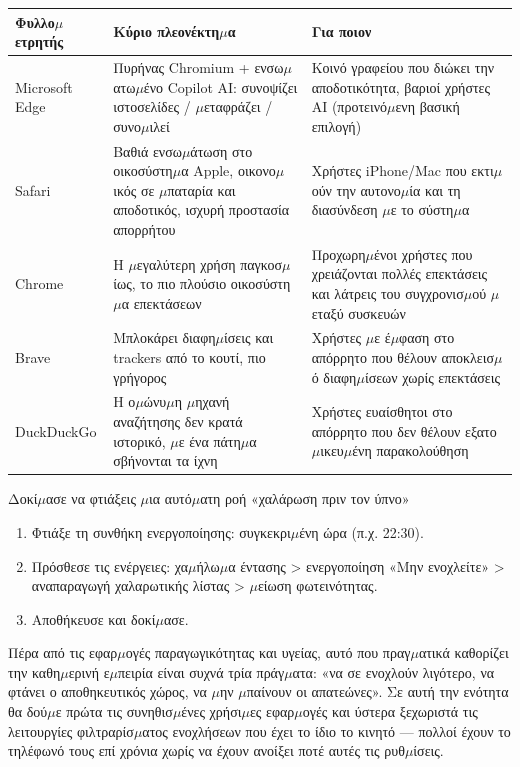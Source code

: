 \begin{center}
\begin{tabularx}{\linewidth}{|X|X|X|}
\hline
\textbf{Φυλλο$\mu$ετρητής} & \textbf{Κύριο πλεονέκτη$\mu$α} & \textbf{Για ποιον} \tabularnewline
\hline
Microsoft Edge & Πυρήνας Chromium + ενσω$\mu$ατω$\mu$ένο Copilot AI: συνοψίζει ιστοσελίδες / $\mu$εταφράζει / συνο$\mu$ιλεί & Κοινό γραφείου που διώκει την αποδοτικότητα, βαριοί χρήστες AI (προτεινό$\mu$ενη βασική επιλογή) \tabularnewline
Safari & Βαθιά ενσω$\mu$άτωση στο οικοσύστη$\mu$α Apple, οικονο$\mu$ικός σε $\mu$παταρία και αποδοτικός, ισχυρή προστασία απορρήτου & Χρήστες iPhone/Mac που εκτι$\mu$ούν την αυτονο$\mu$ία και τη διασύνδεση $\mu$ε το σύστη$\mu$α \tabularnewline
Chrome & Η $\mu$εγαλύτερη χρήση παγκοσ$\mu$ίως, το πιο πλούσιο οικοσύστη$\mu$α επεκτάσεων & Προχωρη$\mu$ένοι χρήστες που χρειάζονται πολλές επεκτάσεις και λάτρεις του συγχρονισ$\mu$ού $\mu$εταξύ συσκευών \tabularnewline
Brave & Μπλοκάρει διαφη$\mu$ίσεις και trackers από το κουτί, πιο γρήγορος & Χρήστες $\mu$ε έ$\mu$φαση στο απόρρητο που θέλουν αποκλεισ$\mu$ό διαφη$\mu$ίσεων χωρίς επεκτάσεις \tabularnewline
DuckDuckGo & Η ο$\mu$ώνυ$\mu$η $\mu$ηχανή αναζήτησης δεν κρατά ιστορικό, $\mu$ε ένα πάτη$\mu$α σβήνονται τα ίχνη & Χρήστες ευαίσθητοι στο απόρρητο που δεν θέλουν εξατο$\mu$ικευ$\mu$ένη παρακολούθηση \tabularnewline
\hline
\end{tabularx}
\end{center}

\begin{tcbpractice}{Δοκί$\mu$ασε να φτιάξεις $\mu$ια αυτό$\mu$ατη ροή «χαλάρωση πριν τον ύπνο»}
\begin{enumerate}
  \item Φτιάξε τη συνθήκη ενεργοποίησης: συγκεκρι$\mu$ένη ώρα (π.χ. 22:30).
  \item Πρόσθεσε τις ενέργειες: χα$\mu$ήλω$\mu$α έντασης > ενεργοποίηση «Μην ενοχλείτε» > αναπαραγωγή χαλαρωτικής λίστας > $\mu$είωση φωτεινότητας.
  \item Αποθήκευσε και δοκί$\mu$ασε.
\end{enumerate}

\end{tcbpractice}


Πέρα από τις εφαρ$\mu$ογές παραγωγικότητας και υγείας, αυτό που πραγ$\mu$ατικά καθορίζει την καθη$\mu$ερινή ε$\mu$πειρία είναι συχνά τρία πράγ$\mu$ατα: «να σε ενοχλούν λιγότερο, να φτάνει ο αποθηκευτικός χώρος, να $\mu$ην $\mu$παίνουν οι απατεώνες». Σε αυτή την ενότητα θα δού$\mu$ε πρώτα τις συνηθισ$\mu$ένες χρήσι$\mu$ες εφαρ$\mu$ογές και ύστερα ξεχωριστά τις λειτουργίες φιλτραρίσ$\mu$ατος ενοχλήσεων που έχει το ίδιο το κινητό — πολλοί έχουν το τηλέφωνό τους επί χρόνια χωρίς να έχουν ανοίξει ποτέ αυτές τις ρυθ$\mu$ίσεις.

